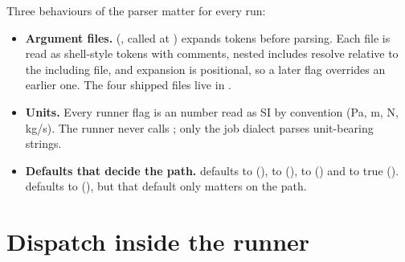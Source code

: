 Three behaviours of the parser matter for every run:
\begin{itemize}
  \item \textbf{Argument files.}  (, called at ) expands  tokens before parsing. Each file is read as shell-style tokens with comments, nested includes resolve relative to the including file, and expansion is positional, so a later flag overrides an earlier one. The four shipped files live in .
  \item \textbf{Units.} Every runner flag is an  number read as SI by convention (Pa, m, N, kg/s). The runner never calls ; only the job dialect parses unit-bearing strings.
  \item \textbf{Defaults that decide the path.}  defaults to  (),  to  (),  to  () and  to true ().  defaults to  (), but that default only matters on the  path.
\end{itemize}


\section{Dispatch inside the runner}\label{sec:df-dispatch}

